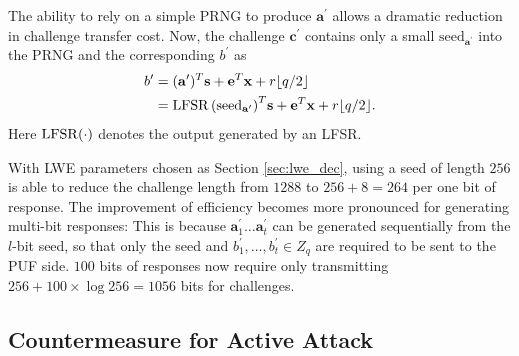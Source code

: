 The ability to rely on a simple PRNG to produce $\mathbf{a}^\prime$ allows a dramatic reduction in challenge transfer cost. 
Now, the challenge $\mathbf{c}^\prime$ contains only a small $\text{seed}_{\mathbf{a}^\prime}$ into the PRNG and the corresponding $b^\prime$ as
\begin{align*}
    b^\prime&=(\mathbf{a}^\prime)^T\mathbf{s}+\mathbf{e}^T\mathbf{x}+r\floor{q/2}\\
    &= \LFSR{(\text{seed}_{\mathbf{a}^\prime})}^T\mathbf{s}+\mathbf{e}^T\mathbf{x}+r\floor{q/2}.
\end{align*}
Here $\LFSR(\cdot)$ denotes the output generated by an LFSR.




With LWE parameters chosen as Section \ref{sec:lwe_dec}, using a seed of length $256$ is able to reduce the challenge length from $1288$ to $256+8=264$ per one bit of response. 
The improvement of efficiency becomes more pronounced for generating multi-bit responses:
This is because $\mathbf{a}^\prime_1 \ldots \mathbf{a}^\prime_t$ can be generated sequentially from the $l$-bit seed, so that only the seed and $b^\prime_1,\ldots, b^\prime_t \in Z_q$ are required to be sent to the PUF side. 
$100$ bits of responses now require only transmitting $256+100\times\log 256 = 1056$ bits for challenges.

\subsection{Countermeasure for Active Attack}
\label{sec:counter}

